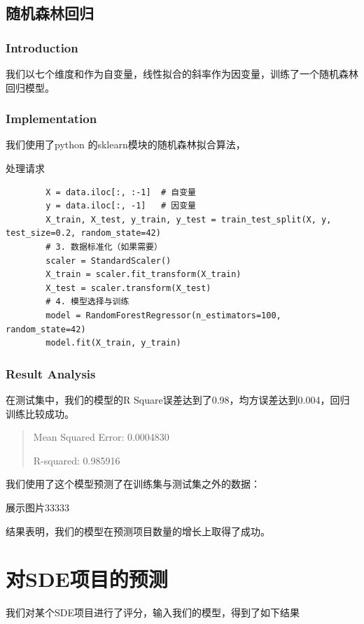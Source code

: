 \documentclass[a4paper]{article}
\begin{document}
\subsection{随机森林回归}
\subsubsection{Introduction}

我们以七个维度和作为自变量，线性拟合的斜率作为因变量，训练了一个随机森林回归模型。

\subsubsection{Implementation}
我们使用了python 的sklearn模块的随机森林拟合算法，
\begin{listing}[htb]
	\caption{处理请求}
	\label{code:processdweet}
	\begin{verbatim}
        X = data.iloc[:, :-1]  # 自变量
        y = data.iloc[:, -1]   # 因变量
        X_train, X_test, y_train, y_test = train_test_split(X, y, test_size=0.2, random_state=42)
        # 3. 数据标准化（如果需要）
        scaler = StandardScaler()
        X_train = scaler.fit_transform(X_train)
        X_test = scaler.transform(X_test)
        # 4. 模型选择与训练
        model = RandomForestRegressor(n_estimators=100, random_state=42)
        model.fit(X_train, y_train)
\end{verbatim}
\end{listing}


\subsubsection{Result Analysis}
在测试集中，我们的模型的R Square误差达到了0.98，均方误差达到0.004，回归训练比较成功。

\begin{quote}
Mean Squared Error: 0.0004830

R-squared: 0.985916
\end{quote}


我们使用了这个模型预测了在训练集与测试集之外的数据：

展示图片33333

结果表明，我们的模型在预测项目数量的增长上取得了成功。



\section{对SDE项目的预测}
我们对某个SDE项目进行了评分，输入我们的模型，得到了如下结果
\end{document}
